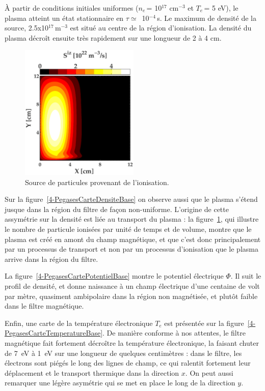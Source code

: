 \begin{refsection}
À partir de conditions initiales uniformes ($n_e\,$= 10$^{17}$ cm$^{-3}$ et
$T_e\,$= 5 eV), le plasma atteint un état stationnaire en $\tau\simeq\,$
10$^{-4}\,$s.
Le maximum de densité de la source, 2.5x10$^{17}\,$m$^{-3}$ est situé au
centre de la région d'ionisation. La densité du plasma décroît ensuite très
rapidement sur une longueur de 2 à 4 cm. 

\begin{figure}[!htbp]\centering
\includegraphics[height=6.5cm]{figures/4-PegasesCarteSourceBase.eps}
\caption{Source de particules provenant de l'ionisation.}
\label{4-PegasesCarteSourceBase}
\end{figure}

Sur la figure~\ref{4-PegasesCarteDensiteBase} on
observe aussi que le plasma s'étend jusque dans la région du filtre de façon
non-uniforme. L'origine de cette assymétrie sur la densité est liée
au transport du plasma : la figure~\ref{4-PegasesCarteSourceBase}, qui illustre
le nombre de particule ionisées par unité de temps et de volume, montre
que le plasma est créé en amont du champ magnétique, et que c'est donc principalement par un
processus de transport et non par un processus d'ionisation que le plasma arrive dans la région du
filtre.

La figure~\ref{4-PegasesCartePotentielBase} montre le potentiel
électrique $\Phi$. Il suit le profil de densité, et donne naissance à un champ
électrique d'une centaine de volt par mètre, quasiment ambipolaire dans la
région non magnétisée, et plutôt faible dans le filtre magnétique.

Enfin, une carte de la température électronique $T_e$ est présentée sur la
figure~\ref{4-PegasesCarteTemperatureBase}. De manière conforme à nos attentes,
le filtre magnétique fait fortement décroître la température électronique, la
faisant chuter de 7~eV à 1~eV sur une longueur de quelques centimètres : dans le
filtre, les électrons sont piégés le long des lignes de champ, ce qui
ralentit fortement leur déplacement et le transport
thermique dans la direction $x$.
On peut aussi remarquer une légère asymétrie qui se met en place le long de la
direction $y$.


\end{refsection}
